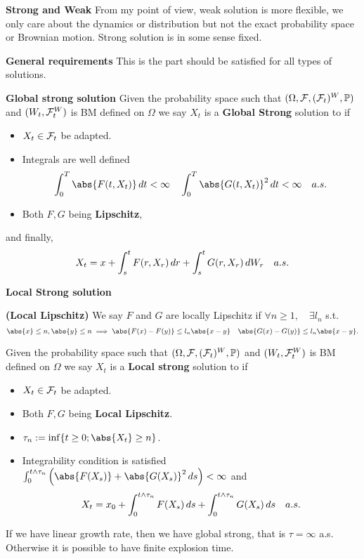 \noindent \textbf{Strong and Weak} From my point of view, weak solution is more flexible, we only care about the dynamics or distribution but not the exact probability space or Brownian motion. Strong solution is in some sense fixed.

\noindent \textbf{General requirements}
This is the part should be satisfied for all types of solutions.

\noindent \textbf{Global strong solution}
Given the probability space such that $(\Omega, \mathcal{F}, (\mathcal{F}_t)^W, \mathbb{P})$ and $(W_t, \mathcal{F}_t^W)$ is BM defined on $\Omega$ we say $X_t$ is a \textbf{Global Strong} solution to if
\begin{itemize}
    \item $X_t\in\mathcal{F}_t$ be adapted.
    \item Integrals are well defined
    \begin{equation*}
        \int_0^T \abs{F(t, X_t)} \diff t < \infty \quad \int_0^T \abs{G(t, X_t)}^2 \diff t < \infty \quad a.s.
    \end{equation*}
    \item Both $F, G$ being \textbf{Lipschitz},
\end{itemize}
and finally, 
\begin{equation*}
    X_t = x + \int_s^t F(r,X_r) \mathop{}\!d r+\int_s^t G(r,X_r) \mathop{}\!d W_r \quad a.s.
\end{equation*}

\noindent \textbf{Local Strong solution}

\begin{dfn}{\textbf{(Local Lipschitz)}}
We say $F$ and $G$ are locally Lipschitz if $\forall n \geq 1, \quad \exists l_n$ s.t.
\begin{equation*}
    \abs{x}\leq n, \abs{y}\leq n \implies \abs{F(x) - F(y)} \leq l_n \abs{x-y} \quad \abs{G(x) - G(y)} \leq l_n \abs{x-y}.
\end{equation*}
\end{dfn}

Given the probability space such that $(\Omega, \mathcal{F}, (\mathcal{F}_t)^W, \mathbb{P})$ and $(W_t, \mathcal{F}_t^W)$ is BM defined on $\Omega$ we say $X_t$ is a \textbf{Local strong} solution to if
\begin{itemize}
    \item $X_t\in\mathcal{F}_t$ be adapted.
    \item Both $F, G$ being \textbf{Local Lipschitz}.
    \item $\tau_n := \inf\{t \geq 0; \abs{X_t} \geq n\}$.
    \item Integrability condition is satisfied $\int_0^{t\wedge \tau_n} \left(\abs{F(X_s)}+\abs{G(X_s)}^2 \diff s \right) <\infty$ and
\begin{equation*}
    X_t = x_0 + \int_0^{t\wedge \tau_n} F(X_s) \mathop{}\!d s + \int_0^{t\wedge \tau_n} G(X_s) \mathop{}\!d s\quad a.s.
\end{equation*}
\end{itemize}
If we have linear growth rate, then we have global strong, that is $\tau = \infty$ a.s. Otherwise it is possible to have finite explosion time.

